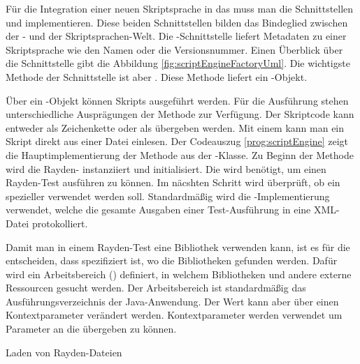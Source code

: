\SuperPar
Für die Integration einer neuen Skriptsprache in das  muss man die Schnittstellen  und  implementieren. Diese beiden Schnittstellen bilden das Bindeglied zwischen der - und der Skriptsprachen-Welt. Die -Schnittstelle liefert Metadaten zu einer Skriptsprache wie den Namen oder die Versionsnummer. Einen Überblick über die Schnittstelle gibt die Abbildung \ref{fig:scriptEngineFactoryUml}. Die wichtigste Methode der Schnittstelle ist aber . Diese Methode liefert ein -Objekt.

\SuperPar
Über ein -Objekt können Skripts ausgeführt werden. Für die Ausführung stehen unterschiedliche Ausprägungen der Methode  zur Verfügung. Der Skriptcode kann entweder als Zeichenkette oder als  übergeben werden. Mit einem  kann man ein Skript direkt aus einer Datei einlesen. Der Codeauszug \ref{prog:scriptEngine} zeigt die Hauptimplementierung der  Methode aus der -Klasse. Zu Beginn der Methode wird die Rayden- instanziiert und initialisiert. Die  wird benötigt, um einen Rayden-Test ausführen zu können. Im näcshten Schritt wird überprüft, ob ein spezieller  verwendet werden soll. Standardmäßig wird die -Implementierung verwendet, welche die gesamte Ausgaben einer Test-Ausführung in eine XML-Datei protokolliert. 

\SuperPar
Damit man in einem Rayden-Test eine Bibliothek verwenden kann, ist es für die  entscheiden, dass spezifiziert ist, wo die Bibliotheken gefunden werden. Dafür wird ein Arbeitsbereich () definiert, in welchem Bibliotheken und andere externe Ressourcen gesucht werden. Der Arbeitsbereich ist standardmäßig das Ausführungsverzeichnis der Java-Anwendung. Der Wert kann aber über einen Kontextparameter verändert werden. Kontextparameter werden verwendet um Parameter an die  übergeben zu können. 

\begin{program}

\caption{Laden von Rayden-Dateien}
\label{prog:loadFile}
\end{program}

